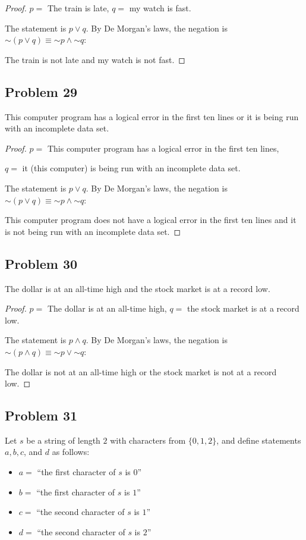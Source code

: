 \documentclass[14pt]{extarticle}
\begin{document}
\begin{proof}
$p =$ The train is late, $q =$ my watch is fast.

The statement is $p \vee q$. By De Morgan's laws, the negation is $\sim(p \vee q) \equiv {\sim p} \wedge {\sim q}$:

The train is not late and my watch is not fast.
\end{proof}

\subsection{Problem 29}
This computer program has a logical error in the first ten lines or it is being run with an incomplete data set.

\begin{proof}
$p =$ This computer program has a logical error in the first ten lines,

$q =$ it (this computer) is being run with an incomplete data set.

The statement is $p \vee q$. By De Morgan's laws, the negation is $\sim(p \vee q) \equiv {\sim p} \wedge {\sim q}$:

This computer program does not have a logical error in the first ten lines and it is not being run with an incomplete data set.
\end{proof}

\subsection{Problem 30}
The dollar is at an all-time high and the stock market is at a record low.

\begin{proof}
$p =$ The dollar is at an all-time high, $q =$ the stock market is at a record low.

The statement is $p \wedge q$. By De Morgan's laws, the negation is $\sim(p \wedge q) \equiv {\sim p} \vee {\sim q}$:

The dollar is not at an all-time high or the stock market is not at a record low.
\end{proof}

\subsection{Problem 31}
Let $s$ be a string of length $2$ with characters from $\{0, 1, 2\}$, and define statements $a, b, c$, and $d$ as follows:

\begin{itemize}
\item $a = $ ``the first character of $s$ is $0$''
\item $b = $ ``the first character of $s$ is $1$''
\item $c = $ ``the second character of $s$ is $1$''
\item $d = $ ``the second character of $s$ is $2$''
\end{itemize}
\end{document}
